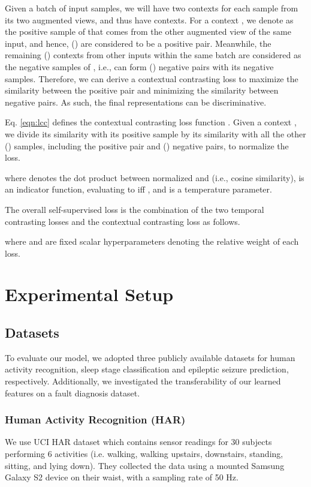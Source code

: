 \documentclass{article}
\begin{document}
Given a batch of  input samples, we will have two contexts for each sample from its two augmented views, and thus have  contexts. 
For a context , we denote  as the positive sample of  that comes from the other augmented view of the same input, and hence, () are considered to be a positive pair.  
Meanwhile, the remaining () contexts from other inputs within the same batch are considered as the negative samples of , i.e.,  can form () negative pairs with its negative samples. Therefore, we can derive a contextual contrasting loss to maximize the similarity between the positive pair and minimizing the similarity between negative pairs. As such, the final representations can be discriminative. 

Eq. \ref{eqn:lcc} defines the contextual contrasting loss function . Given a context , we divide its similarity with its positive sample  by its similarity with all the other () samples, including the positive pair and () negative pairs, to normalize the loss. 


where  denotes the dot product between  normalized  and  (i.e., cosine similarity),  is an indicator function, evaluating to  iff , and  is a temperature parameter.

The overall self-supervised loss is the combination of the two temporal contrasting losses and the contextual contrasting loss as follows.

where  and  are fixed scalar hyperparameters denoting the relative weight of each loss.


\section{Experimental Setup}
\subsection{Datasets}
To evaluate our model, we adopted three publicly available datasets for human activity recognition, sleep stage classification and epileptic seizure prediction, respectively. Additionally, we investigated the transferability of our learned features on a fault diagnosis dataset. 


\subsubsection{Human Activity Recognition (HAR)}
We use UCI HAR dataset \cite{anguita2013public} which contains sensor readings for 30 subjects performing 6 activities (i.e. walking, walking upstairs, downstairs, standing, sitting, and lying down). They collected the data using a mounted Samsung Galaxy S2 device on their waist, with a sampling rate of 50 Hz.
\end{document}
